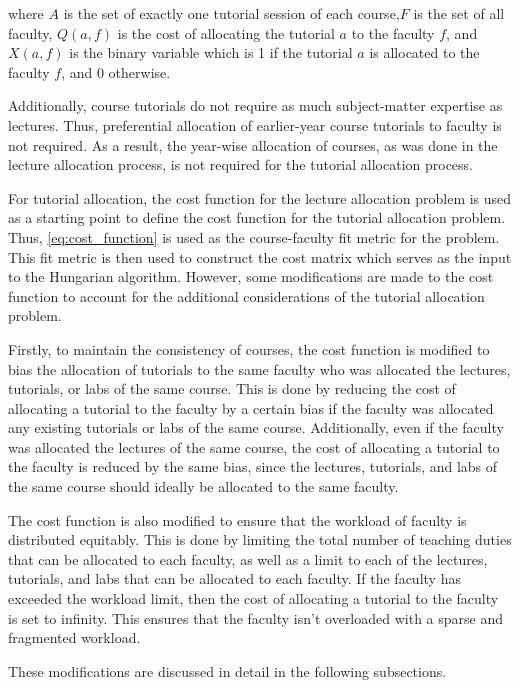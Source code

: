 where $A$ is the set of exactly one tutorial session of each course,$F$ is the set of all faculty, $Q(a, f)$ is the cost of allocating the tutorial $a$ to the faculty $f$, and $X(a, f)$ is the binary variable which is 1 if the tutorial $a$ is allocated to the faculty $f$, and 0 otherwise.

Additionally, course tutorials do not require as much subject-matter expertise as lectures. Thus, preferential allocation of earlier-year course tutorials to faculty is not required. As a result, the year-wise allocation of courses, as was done in the lecture allocation process, is not required for the tutorial allocation process.

For tutorial allocation, the cost function for the lecture allocation problem is used as a starting point to define the cost function for the tutorial allocation problem. Thus, \autoref{eq:cost_function} is used as the course-faculty fit metric for the problem. This fit metric is then used to construct the cost matrix which serves as the input to the Hungarian algorithm. However, some modifications are made to the cost function to account for the additional considerations of the tutorial allocation problem.

Firstly, to maintain the consistency of courses, the cost function is modified to bias the allocation of tutorials to the same faculty who was allocated the lectures, tutorials, or labs of the same course. This is done by reducing the cost of allocating a tutorial to the faculty by a certain bias if the faculty was allocated any existing tutorials or labs of the same course. Additionally, even if the faculty was allocated the lectures of the same course, the cost of allocating a tutorial to the faculty is reduced by the same bias, since the lectures, tutorials, and labs of the same course should ideally be allocated to the same faculty.

The cost function is also modified to ensure that the workload of faculty is distributed equitably. This is done by limiting the total number of teaching duties that can be allocated to each faculty, as well as a limit to each of the lectures, tutorials, and labs that can be allocated to each faculty. If the faculty has exceeded the workload limit, then the cost of allocating a tutorial to the faculty is set to infinity. This ensures that the faculty isn't overloaded with a sparse and fragmented workload.

These modifications are discussed in detail in the following subsections.


